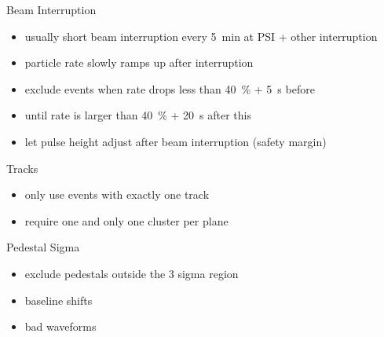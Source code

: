 \begin{frame}{Beam Interruption}
	

	\begin{itemize}\itemfill
		\item<1-> usually short beam interruption every \SI{5}{\minute} at PSI + other interruption
		\item<2-> particle rate slowly ramps up after interruption
		\item<2-> exclude events when rate drops less than \SI{40}{\%} + \SI{5}{\second} before
		\item<2->  until rate is larger than \SI{40}{\%} + \SI{20}{\second} after this
		\item<2-> let pulse height adjust after beam interruption (safety margin)
	\end{itemize}
	
\end{frame}
\begin{frame}{Tracks}
	

	\begin{itemize}\itemfill
		\item only use events with exactly one track
		\item require one and only one cluster per plane
	\end{itemize}
	
\end{frame}
\begin{frame}{Pedestal Sigma}
	

	\begin{itemize}\itemfill
		\item exclude pedestals outside the 3 sigma region
		\item baseline shifts
		\item bad waveforms
	\end{itemize}
	
\end{frame}
